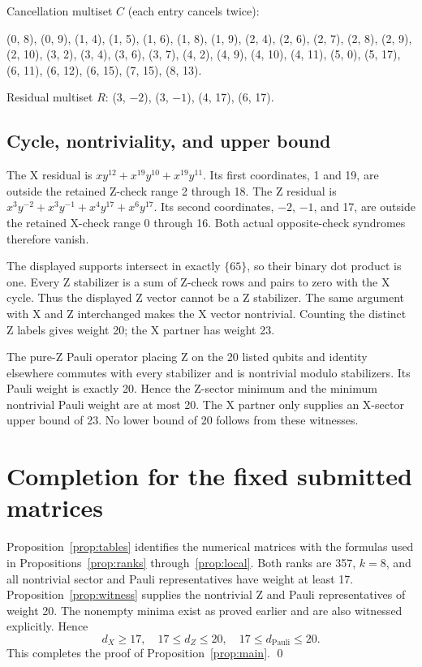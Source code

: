 \documentclass{article}
\begin{document}
Cancellation multiset \(C\) (each entry cancels twice):

(0, 8), (0, 9), (1, 4), (1, 5), (1, 6), (1, 8), (1, 9), (2, 4), (2, 6), (2, 7), (2, 8), (2, 9),
(2, 10), (3, 2), (3, 4), (3, 6), (3, 7), (4, 2), (4, 9), (4, 10), (4, 11), (5, 0), (5, 17),
(6, 11), (6, 12), (6, 15), (7, 15), (8, 13).

Residual multiset \(R\): (3, \(-2\)), (3, \(-1\)), (4, 17), (6, 17).

\subsection{Cycle, nontriviality, and upper bound}\label{sec:witness-upper}

The X residual is \(x y^{12} + x^{19} y^{10} + x^{19} y^{11}\). Its first coordinates, 1 and 19,
are outside the retained Z-check range 2 through 18. The Z residual is
\(x^3 y^{-2} + x^3 y^{-1} + x^4 y^{17} + x^6 y^{17}\). Its second coordinates, \(-2\), \(-1\),
and 17, are outside the retained X-check range 0 through 16. Both actual opposite-check
syndromes therefore vanish.

The displayed supports intersect in exactly \(\{65\}\), so their binary dot product is one. Every
Z stabilizer is a sum of Z-check rows and pairs to zero with the X cycle. Thus the displayed Z
vector cannot be a Z stabilizer. The same argument with X and Z interchanged makes the X vector
nontrivial. Counting the distinct Z labels gives weight 20; the X partner has weight 23.

The pure-Z Pauli operator placing Z on the 20 listed qubits and identity elsewhere commutes with
every stabilizer and is nontrivial modulo stabilizers. Its Pauli weight is exactly 20. Hence the
Z-sector minimum and the minimum nontrivial Pauli weight are at most 20. The X partner only
supplies an X-sector upper bound of 23. No lower bound of 20 follows from these witnesses.

\section{Completion for the fixed submitted matrices}\label{sec:completion}

Proposition~\ref{prop:tables} identifies the numerical matrices with the formulas used in
Propositions~\ref{prop:ranks} through~\ref{prop:local}. Both ranks are 357, \(k = 8\), and all
nontrivial sector and Pauli representatives have weight at least 17.
Proposition~\ref{prop:witness} supplies the nontrivial Z and Pauli representatives of weight 20.
The nonempty minima exist as proved earlier and are also witnessed explicitly. Hence
\begin{equation}
  d_X \ge 17, \quad 17 \le d_Z \le 20, \quad 17 \le d_{\text{Pauli}} \le 20.
\end{equation}
This completes the proof of Proposition~\ref{prop:main}. \qed
\end{document}
